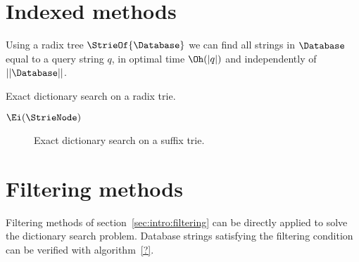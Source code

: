 \section{Indexed methods}

Using a radix tree $\StrieOf{\Database}$ we can find all strings in $\Database$ equal to a query string $q$, in optimal time $\Oh(|q|)$ and independently of $||\Database||$.

\begin{algorithm}[h]
\caption{Exact dictionary search on a radix trie.}
\label{alg:dict-exact}
\begin{algorithmic}[1]
		\State \Report $\Ei(\StrieNode)$
		\State {}
	\EndIf
\EndProcedure
\end{algorithmic}
\end{algorithm}

\begin{figure}[h]
\begin{center}
\caption{Exact dictionary search on a suffix trie.}
\label{fig:dict-exact}

\end{center}
\end{figure}

\section{Filtering methods}

Filtering methods of section~\ref{sec:intro:filtering} can be directly applied to solve the dictionary search problem. Database strings satisfying the filtering condition can be verified with algorithm~\ref{?}.

